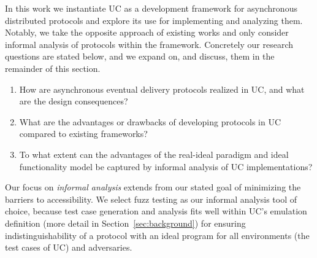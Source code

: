 

In this work we instantiate UC as a development framework for asynchronous
distributed protocols and explore its use for implementing and analyzing them.
Notably, we take the opposite approach of existing works and only consider
informal analysis of protocols within the framework.  Concretely our research
questions are stated below, and we expand on, and discuss, them in the
remainder of this section.
\begin{enumerate}
\item How are asynchronous eventual delivery protocols realized in UC, and what
are the design consequences?
\item What are the advantages or drawbacks of developing protocols in UC
compared to existing frameworks?
\item To what extent can the advantages of the real-ideal paradigm and ideal
functionality model be captured by informal analysis of UC implementations?
\end{enumerate}
Our focus on \emph{informal analysis} extends from our stated goal of
minimizing the barriers to accessibility.  We select fuzz testing as our
informal analysis tool of choice, because test case generation and analysis
fits well within UC's emulation definition (more detail in
Section~\ref{sec:background}) for ensuring indistinguishability of a protocol
with an ideal program for all environments (the test cases of UC) and
adversaries.

